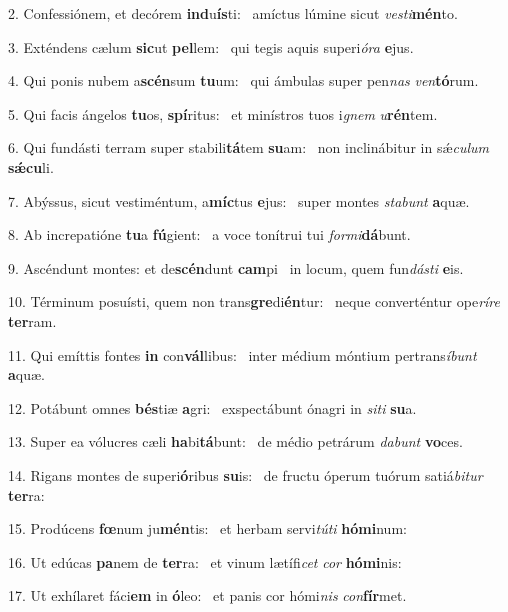 2. Confessiónem, et decórem \textbf{ind}u\textbf{ís}ti: \ast\  amíctus lúmine sicut \textit{ves}\textit{ti}\textbf{mén}to.\

3. Exténdens cælum \textbf{sic}ut \textbf{pel}lem: \ast\  qui tegis aquis superi\textit{ó}\textit{ra} \textbf{e}jus.\

4. Qui ponis nubem a\textbf{scén}sum \textbf{tu}um: \ast\  qui ámbulas super pen\textit{nas} \textit{ven}\textbf{tó}rum.\

5. Qui facis ángelos \textbf{tu}os, \textbf{spí}ritus: \ast\  et minístros tuos i\textit{gnem} \textit{u}\textbf{rén}tem.\

6. Qui fundásti terram super stabili\textbf{tá}tem \textbf{su}am: \ast\  non inclinábitur in sǽ\textit{cu}\textit{lum} \textbf{sǽ}\textbf{cu}li.\

7. Abýssus, sicut vestiméntum, a\textbf{míc}tus \textbf{e}jus: \ast\  super montes \textit{sta}\textit{bunt} \textbf{a}quæ.\

8. Ab increpatióne \textbf{tu}a \textbf{fú}gient: \ast\  a voce tonítrui tui \textit{for}\textit{mi}\textbf{dá}bunt.\

9. Ascéndunt montes: et de\textbf{scén}dunt \textbf{cam}pi \ast\  in locum, quem fun\textit{dás}\textit{ti} \textbf{e}is.\

10. Términum posuísti, quem non trans\textbf{gre}di\textbf{én}tur: \ast\  neque converténtur ope\textit{rí}\textit{re} \textbf{ter}ram.\

11. Qui emíttis fontes \textbf{in} con\textbf{vál}libus: \ast\  inter médium móntium pertrans\textit{í}\textit{bunt} \textbf{a}quæ.\

12. Potábunt omnes \textbf{bés}tiæ \textbf{a}gri: \ast\  exspectábunt ónagri in \textit{si}\textit{ti} \textbf{su}a.\

13. Super ea vólucres cæli \textbf{ha}bi\textbf{tá}bunt: \ast\  de médio petrárum \textit{da}\textit{bunt} \textbf{vo}ces.\

14. Rigans montes de superi\textbf{ó}ribus \textbf{su}is: \ast\  de fructu óperum tuórum satiá\textit{bi}\textit{tur} \textbf{ter}ra:\

15. Prodúcens \textbf{fœ}num ju\textbf{mén}tis: \ast\  et herbam servi\textit{tú}\textit{ti} \textbf{hó}\textbf{mi}num:\

16. Ut edúcas \textbf{pa}nem de \textbf{ter}ra: \ast\  et vinum lætífi\textit{cet} \textit{cor} \textbf{hó}\textbf{mi}nis:\

17. Ut exhílaret fáci\textbf{em} in \textbf{ó}leo: \ast\  et panis cor hómi\textit{nis} \textit{con}\textbf{fír}met.\

